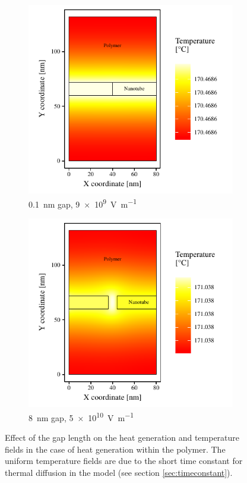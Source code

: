 \documentclass[11pt,review,times]{article}
\begin{document}
\begin{figure}[htb]
	\begin{subfigure}{0.49\textwidth}
		\centering
		\captionsetup{width=0.9\textwidth}
		\includegraphics[width=\textwidth]{resultats_0,1nm_comsol_2D_temp}
		\caption{\SI{0.1}{\nano\metre} gap, \SI{9e9}{\volt\per\metre}}
		\label{fig:result_gap01nm_temp}		
	\end{subfigure} 
	\begin{subfigure}{0.49\textwidth}
		\centering
		\captionsetup{width=0.9\textwidth}
		\includegraphics[width=\textwidth]{resultats_8nm_comsol_2D_temp}
		\caption{\SI{8}{\nano\metre} gap, \SI{5e10}{\volt\per\metre}}
		\label{fig:result_gap8nm_temp}		
	\end{subfigure}
	\caption{Effect of the gap length on the heat generation and temperature fields in the case of heat generation within the polymer. The uniform temperature fields are due to the short time constant for thermal diffusion in the model (see section \ref{sec:timeconstant}).}
	\label{fig:result_gap}
\end{figure}
\end{document}
